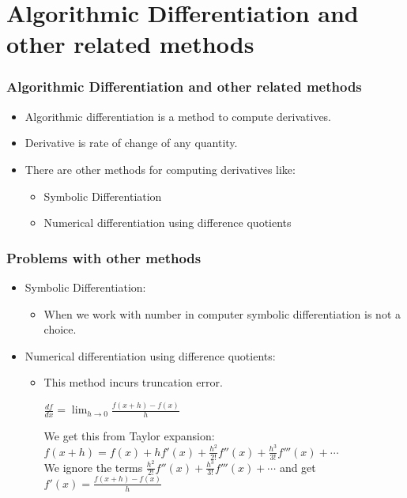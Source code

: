 \documentclass[10pt]{beamer}
\begin{document}
\section{Algorithmic Differentiation and other related methods}
\begin{frame}
\frametitle{Algorithmic Differentiation and other related methods}
\begin{itemize}
\item Algorithmic differentiation is a method to compute derivatives.\\
\item Derivative is rate of change of any quantity. 
\item There are other methods for computing derivatives like:
\begin{itemize}
\item Symbolic Differentiation
\item Numerical differentiation using difference quotients
\end{itemize}
\end{itemize}
\end{frame}
\begin{frame}
\frametitle{Problems with other methods}
\begin{itemize}
\item Symbolic Differentiation:
\begin{itemize}
\item When we work with number in computer symbolic differentiation is not a choice.
\end{itemize}
\item Numerical differentiation using difference quotients:
\begin{itemize}
\item This method incurs truncation error.

 $\frac{df}{dx} = \lim_{h \to 0}\frac{f(x+h) - f(x)}{h}$

We get this from Taylor expansion:
 $f(x + h) = f(x) + hf'(x) + \frac{h^2}{2!}f''(x) + \frac{h^3}{3!}f'''(x) + \cdots$\\
We ignore the terms $ \frac{h^2}{2!}f''(x) + \frac{h^3}{3!}f'''(x) + \cdots$ and get\\

$f'(x) = \frac{f(x+h) - f(x)}{h}$

\end{itemize}
\end{itemize}
\end{frame}
\end{document}
